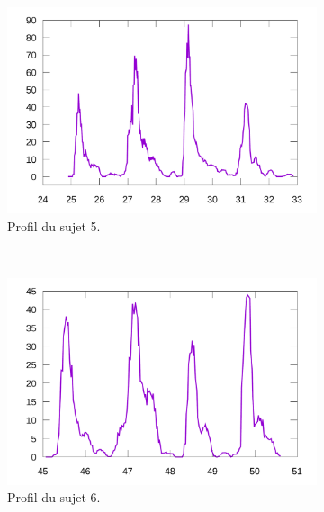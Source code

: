 	\begin{figure}[!htb]
		\centering
		\begin{subfigure}[t]{\subImgWlineplot}
			\centering
			\includegraphics[width=\textwidth]{figures/ch4/subject_05_static_condition_smoothed}
			\caption{Profil du sujet 5.}
			\label{fig:staticProfile5}
		\end{subfigure}
		~
		\begin{subfigure}[t]{\subImgWlineplot}
			\centering
			\includegraphics[width=\textwidth]{figures/ch4/subject_06_static_condition_smoothed}
			\caption{Profil du sujet 6.}
			\label{fig:staticProfile6}
		\end{subfigure}
		~
		\begin{subfigure}[t]{\subImgWlineplot}
			\centering

\end{subfigure}
\end{figure}
